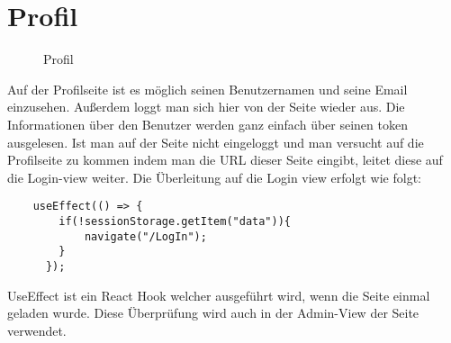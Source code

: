 \section{Profil}
\label{profile}

\begin{figure}[H]
    \begin{center}
      \caption{Profil}
    \end{center}
\end{figure}

Auf der Profilseite ist es möglich seinen Benutzernamen und seine Email einzusehen. Außerdem loggt 
man sich hier von der Seite wieder aus. Die Informationen über den Benutzer werden ganz einfach über 
seinen token ausgelesen. Ist man auf der Seite nicht eingeloggt und man versucht auf die Profilseite
zu kommen indem man die URL dieser Seite eingibt, leitet diese auf die Login-view weiter. Die
Überleitung auf die Login view erfolgt wie folgt:

\begin{lstlisting}
    useEffect(() => {
        if(!sessionStorage.getItem("data")){
            navigate("/LogIn");
        }
      });
\end{lstlisting}

UseEffect ist ein React Hook welcher ausgeführt wird, wenn die Seite einmal geladen wurde. Diese 
Überprüfung wird auch in der Admin-View der Seite verwendet. 